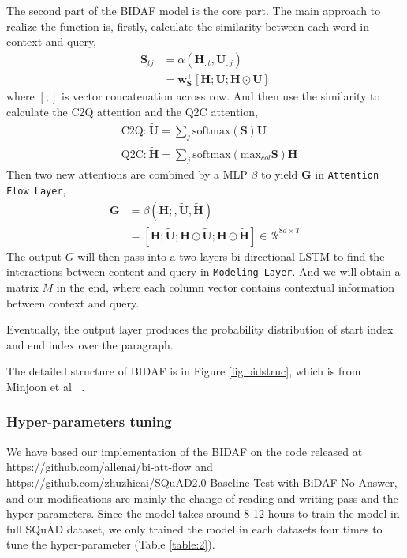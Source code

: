 \documentclass{article}
\begin{document}
    The second part of the BIDAF model is the core part. The main approach to realize the function is, firstly, calculate the similarity between each word in context and query,
    \begin{align*}
        \mathbf{S}_{tj}&=\alpha(\mathbf{H}_{:t}, \mathbf{U}_{:j})\\
        &=\mathbf{w}^\top_{\mathbf{S}}[\mathbf{H};\mathbf{U};\mathbf{H}\odot \mathbf{U}]
    \end{align*}
    where $[;]$ is vector concatenation across row. And then use the similarity to calculate the C2Q attention and the Q2C attention,
    \begin{align*}
        &\text{C2Q:}\ \tilde{\mathbf{U}}=\sum_j\text{softmax}(\mathbf{S})\mathbf{U}\\
        &\text{Q2C:}\ \tilde{\mathbf{H}}=\sum_j\text{softmax}(\text{max}_{col}\mathbf{S})\mathbf{H}
    \end{align*}
    Then two new attentions are combined by a MLP $\beta$ to yield $\mathbf{G}$ in \verb|Attention Flow Layer|,
    \begin{align*}
        \mathbf{G}&=\beta(\mathbf{H};,\tilde{\mathbf{U}},\tilde{\mathbf{H}})\\
        &=[\mathbf{H};\tilde{\mathbf{U}};\mathbf{H}\odot\mathbf{\tilde{\mathbf{U}}};\mathbf{H}\odot\mathbf{\tilde{\mathbf{H}}}]\in\mathcal{R}^{8d\times T}
    \end{align*}
    The output $G$ will then pass into a two layers bi-directional LSTM to find the interactions between content and query in \verb|Modeling Layer|. And we will obtain a matrix $M$ in the end, where each column vector contains contextual information between context and query.
    
    Eventually, the output layer produces the probability distribution of start index and end index over the paragraph.
    
    The detailed structure of BIDAF is in Figure \ref{fig:bidstruc}, which is from Minjoon et al [].
    \newpage
\subsubsection{Hyper-parameters tuning}
    We have based our implementation of the BIDAF on the code released at https://github.com/allenai/bi-att-flow and https://github.com/zhuzhicai/SQuAD2.0-Baseline-Test-with-BiDAF-No-Answer, and our modifications are mainly the change of reading and writing pass and the hyper-parameters. Since the model takes around 8-12 hours to train the model in full SQuAD dataset, we only trained the model in each datasets four times to tune the hyper-parameter (Table \ref{table:2}).
    
\end{document}
